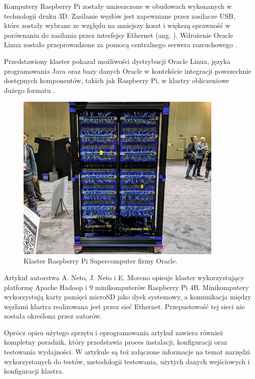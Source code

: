 Komputery Raspberry Pi zostały umieszczone w obudowach wykonanych w technologii druku 3D.
Zasilanie węzłów jest zapewniane przez zasilacze USB, które zostały wybrane ze względu na
mniejszy koszt i większą sprawność w porównaniu do zasilania przez interfejsy Ethernet
(ang. ). Wdrożenie Oracle Linux zostało przeprowadzone
za pomocą centralnego serwera rozruchowego \cite{oracle-cluster-1}.

Przedstawiony klaster pokazał możliwości dystrybucji Oracle Linux, języka programowania Java
oraz bazy danych Oracle w kontekście integracji powszechnie dostępnych komponentów, takich jak
Raspberry Pi, w klastry obliczeniowe dużego formatu \cite{oracle-cluster-2}.
\newpage

\begin{figure}
      \centering
      \includegraphics[width=0.9\textwidth]{graf/Oracle.jpg}
      \caption {Klaster Raspberry Pi Supercomputer firmy Oracle. \cite{oracle-cluster-1}}
      \label{fig:oracle-cluster}
\end{figure}

Artykuł autorstwa A. Neto, J. Neto i E. Moreno \cite{rpi-cluster-1} opisuje klaster
 wykorzystujący platformę Apache Hadoop i 9 minikomputerów Raspberry Pi 4B.
Minikomputery wykorzystują karty pamięci microSD jako dysk systemowy, a komunikacja
między węzłami klastra realizowana jest przez sieć Ethernet. Przepustowość tej sieci
nie została określona przez autorów.

Oprócz opisu użytego sprzętu i oprogramowania artykuł zawiera również kompletny poradnik,
który przedstawia proces instalacji, konfiguracji oraz testowania wydajności. W artykule
są też załączone informacje na temat narzędzi wykorzystanych do testów, metodologii
testowania, użytych danych wejściowych i konfiguracji klastra.

